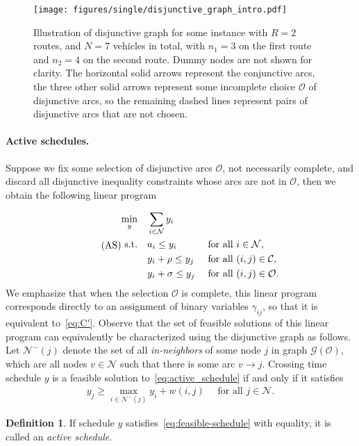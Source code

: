 \documentclass[a4paper]{report}
\theoremstyle{definition}
\newtheorem{define}{Definition}[chapter]
\theoremstyle{plain}
\begin{document}
\begin{figure}
  \centering
  \texttt{[image: figures/single/disjunctive\_graph\_intro.pdf]}
  \caption{Illustration of disjunctive graph for some instance with $R=2$
    routes, and $N=7$ vehicles in total, with $n_{1} = 3$ on the first route and
    $n_{2} = 4$ on the second route. Dummy nodes are not shown for clarity. The
    horizontal solid arrows represent the conjunctive arcs, the three other
    solid arrows represent some incomplete choice $\mathcal{O}$ of disjunctive
    arcs, so the remaining dashed lines represent pairs of disjunctive arcs that
    are not chosen.}\label{fig:disjunctive-graph-intro}
\end{figure}

\paragraph{Active schedules.}

Suppose we fix some selection of disjunctive arcs $\mathcal{O}$, not necessarily
complete, and discard all disjunctive inequality constraints whose arcs are not
in $\mathcal{O}$, then we obtain the following linear program

\begin{equation}\label{eq:active_schedule}\tag{AS}
\begin{alignedat}{3}
  \min_{y} \quad & \sum_{i \in \mathcal{N}} y_{i} \\
  \text{s.t.} \quad & a_{i} \leq y_{i} && \quad \text{ for all } i \in \mathcal{N}, \notag \\
                 & y_{i} + \rho \leq y_{j} && \quad \text{ for all } (i,j) \in \mathcal{C}, \notag \\
                 & y_{i} + \sigma \leq y_{j} && \quad \text{ for all } (i,j) \in \mathcal{O} . \notag
\end{alignedat}
\end{equation}
We emphasize that when the selection $\mathcal{O}$ is complete, this linear
program corresponds directly to an assignment of binary variables $\gamma_{ij}$, so
that it is equivalent to~\eqref{eq:C'}.
%
Observe that the set of feasible solutions of this linear program can
equivalently be characterized using the disjunctive graph as follows.
%
Let $\mathcal{N}^{-}(j)$ denote the set of all \emph{in-neighbors} of some node
$j$ in graph $\mathcal{G}(\mathcal{O})$, which are all nodes $v \in \mathcal{N}$ such that
there is some arc $v \rightarrow j$.
%
Crossing time schedule $y$ is a feasible solution to~\eqref{eq:active_schedule} if and only if it
satisfies
\begin{align}\label{eq:feasible-schedule}
    y_j \geq \max_{i \in \mathcal{N}^{-}(j)} y_i + w(i,j)
    \quad \text{ for all } j \in \mathcal{N} .
\end{align}
%
\begin{define}\label{def:active}
  If schedule $y$ satisfies~\eqref{eq:feasible-schedule} with equality, it is called an
  \emph{active schedule}.
\end{define}
%
\end{document}
